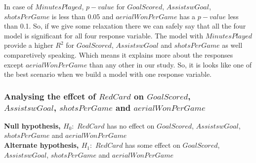 \documentclass[12pt]{article}
\begin{document}
In case of $ MinutesPlayed $, $ p-value $ for $ GoalScored $, $ AssistswGoal $, $ shotsPerGame $ is less than 0.05 and $ aerialWonPerGame $ has a $ p-value $ less than 0.1. So, if we give some relaxation there we can safely say that all the four model is significant for all four response variable. The model with $ MinutesPlayed $ provide a higher $ R^2 $ for $ GoalScored $, $ AssistswGoal $ and $ shotsPerGame $ as well comparetively speaking. Which means it explains more about the responses except $ aerialWonPerGame $ than any other in our study. So, it is looks like one of the best scenario when we build a model with one response variable.

\newpage

\subsubsection{Analysing the effcet of $ RedCard $ on $ GoalScored $, \\ $ AssistswGoal $, $ shotsPerGame $ and $ aerialWonPerGame $}

\textbf{Null hypothesis, $ H_0: $} $ RedCard $ has no effect on $ GoalScored $, $ AssistswGoal $, $ shotsPerGame $ and $ aerialWonPerGame $\\
\textbf{Alternate hypothesis, $ H_1: $} $ RedCard $ has some effect on $ GoalScored $, $ AssistswGoal $, $ shotsPerGame $ and $ aerialWonPerGame $
\end{document}
